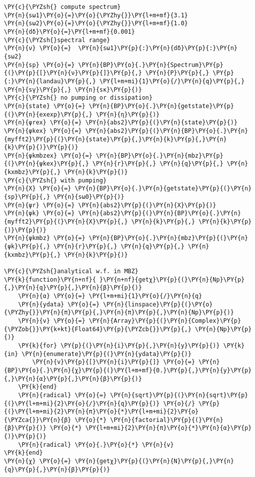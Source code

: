 \begin{Verbatim}[commandchars=\\\{\}]
\PY{c}{\PYZsh{} compute spectrum}
\PY{n}{sω1}\PY{o}{=}\PY{o}{\PYZhy{}}\PY{l+m+mf}{3.1}
\PY{n}{sω2}\PY{o}{=}\PY{o}{\PYZhy{}}\PY{l+m+mf}{1.0}
\PY{n}{dδ}\PY{o}{=}\PY{l+m+mf}{0.001}
\PY{c}{\PYZsh{}spectral range}
\PY{n}{ν} \PY{o}{=}  \PY{n}{sω1}\PY{p}{:}\PY{n}{dδ}\PY{p}{:}\PY{n}{sω2}
\PY{n}{sp} \PY{o}{=} \PY{n}{BP}\PY{o}{.}\PY{n}{Spectrum}\PY{p}{(}\PY{p}{[}\PY{n}{ν}\PY{p}{]}\PY{p}{,} \PY{n}{P}\PY{p}{,} \PY{p}{:}\PY{n}{landau}\PY{p}{,} \PY{l+m+mi}{1}\PY{o}{/}\PY{n}{q}\PY{p}{,} \PY{n}{sγ}\PY{p}{,} \PY{n}{sκ}\PY{p}{)}
\PY{c}{\PYZsh{} no pumping or dissipation}
\PY{n}{state} \PY{o}{=} \PY{n}{BP}\PY{o}{.}\PY{n}{getstate}\PY{p}{(}\PY{n}{exexp}\PY{p}{,} \PY{n}{η}\PY{p}{)}
\PY{n}{ψrex} \PY{o}{=} \PY{n}{abs2}\PY{p}{(}\PY{n}{state}\PY{p}{)}
\PY{n}{ψkex} \PY{o}{=} \PY{n}{abs2}\PY{p}{(}\PY{n}{BP}\PY{o}{.}\PY{n}{myfft2}\PY{p}{(}\PY{n}{state}\PY{p}{,}\PY{n}{k}\PY{p}{,}\PY{n}{k}\PY{p}{)}\PY{p}{)}
\PY{n}{ψkmbzex} \PY{o}{=} \PY{n}{BP}\PY{o}{.}\PY{n}{mbz}\PY{p}{(}\PY{n}{ψkex}\PY{p}{,} \PY{n}{r}\PY{p}{,} \PY{n}{q}\PY{p}{,} \PY{n}{kxmbz}\PY{p}{,} \PY{n}{k}\PY{p}{)}
\PY{c}{\PYZsh{} with pumping}
\PY{n}{X} \PY{o}{=} \PY{n}{BP}\PY{o}{.}\PY{n}{getstate}\PY{p}{(}\PY{n}{sp}\PY{p}{,} \PY{n}{sω0}\PY{p}{)}
\PY{n}{ψr} \PY{o}{=} \PY{n}{abs2}\PY{p}{(}\PY{n}{X}\PY{p}{)}
\PY{n}{ψk} \PY{o}{=} \PY{n}{abs2}\PY{p}{(}\PY{n}{BP}\PY{o}{.}\PY{n}{myfft2}\PY{p}{(}\PY{n}{X}\PY{p}{,} \PY{n}{k}\PY{p}{,} \PY{n}{k}\PY{p}{)}\PY{p}{)}
\PY{n}{ψkmbz} \PY{o}{=} \PY{n}{BP}\PY{o}{.}\PY{n}{mbz}\PY{p}{(}\PY{n}{ψk}\PY{p}{,} \PY{n}{r}\PY{p}{,} \PY{n}{q}\PY{p}{,} \PY{n}{kxmbz}\PY{p}{,} \PY{n}{k}\PY{p}{)}

\PY{c}{\PYZsh{}analytical w.f. in MBZ}
\PY{k}{function}\PY{n+nf}{ }\PY{n+nf}{getχ}\PY{p}{(}\PY{n}{Np}\PY{p}{,}\PY{n}{q}\PY{p}{,}\PY{n}{β}\PY{p}{)}
    \PY{n}{α} \PY{o}{=} \PY{l+m+mi}{1}\PY{o}{/}\PY{n}{q}
    \PY{n}{ydata} \PY{o}{=} \PY{n}{linspace}\PY{p}{(}\PY{o}{\PYZhy{}}\PY{n}{π}\PY{p}{,}\PY{n}{π}\PY{p}{,}\PY{n}{Np}\PY{p}{)}
    \PY{n}{v} \PY{o}{=} \PY{n}{Array}\PY{p}{(}\PY{n}{Complex}\PY{p}{\PYZob{}}\PY{k+kt}{Float64}\PY{p}{\PYZcb{}}\PY{p}{,} \PY{n}{Np}\PY{p}{)}
    \PY{k}{for} \PY{p}{(}\PY{n}{i}\PY{p}{,}\PY{n}{y}\PY{p}{)} \PY{k}{in} \PY{n}{enumerate}\PY{p}{(}\PY{n}{ydata}\PY{p}{)}
        \PY{n}{v}\PY{p}{[}\PY{n}{i}\PY{p}{]} \PY{o}{=} \PY{n}{BP}\PY{o}{.}\PY{n}{χ}\PY{p}{(}\PY{l+m+mf}{0.}\PY{p}{,}\PY{n}{y}\PY{p}{,}\PY{n}{α}\PY{p}{,}\PY{n}{β}\PY{p}{)}
    \PY{k}{end}
    \PY{n}{radical} \PY{o}{=} \PY{n}{sqrt}\PY{p}{(}\PY{n}{sqrt}\PY{p}{(}\PY{l+m+mi}{2}\PY{o}{/}\PY{n}{q}\PY{p}{)} \PY{o}{/} \PY{p}{(}\PY{l+m+mi}{2}\PY{n}{π}\PY{o}{*}\PY{l+m+mi}{2}\PY{o}{\PYZca{}}\PY{n}{β} \PY{o}{*} \PY{n}{factorial}\PY{p}{(}\PY{n}{β}\PY{p}{)} \PY{o}{*} \PY{l+m+mi}{2}\PY{n}{π}\PY{o}{*}\PY{n}{α}\PY{p}{)}\PY{p}{)}
    \PY{n}{radical} \PY{o}{.}\PY{o}{*} \PY{n}{v}
\PY{k}{end}
\PY{n}{χ} \PY{o}{=} \PY{n}{getχ}\PY{p}{(}\PY{n}{N}\PY{p}{,}\PY{n}{q}\PY{p}{,}\PY{n}{β}\PY{p}{)}


\end{Verbatim}
